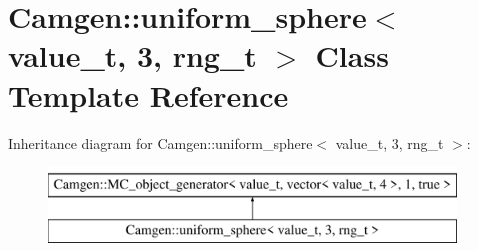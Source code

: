 \hypertarget{a00552}{\section{Camgen\-:\-:uniform\-\_\-sphere$<$ value\-\_\-t, 3, rng\-\_\-t $>$ Class Template Reference}
\label{a00552}
}
Inheritance diagram for Camgen\-:\-:uniform\-\_\-sphere$<$ value\-\_\-t, 3, rng\-\_\-t $>$\-:\begin{figure}[H]
\begin{center}
\leavevmode
\includegraphics[height=2.000000cm]{a00552}
\end{center}
\end{figure}
